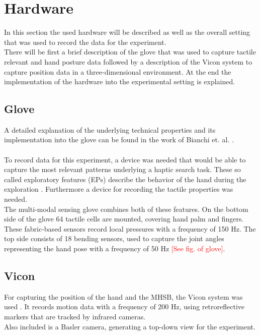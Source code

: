 \section{Hardware} \label{Hardware}
In this section the used hardware will be described as well as the overall setting that was used to record the data for the experiment.\\
There will be first a brief description of the glove that was used to capture tactile relevant and hand posture data followed by a description of the Vicon system to capture position data in a three-dimensional environment. At the end the implementation of the hardware into the experimental setting is explained.

\subsection{Glove}
A detailed explanation of the underlying technical properties and its implementation into the glove can be found in the work of Bianchi et. al. \cite{Glove}.\\
\\
To record data for this experiment, a device was needed that would be able to capture the most relevant patterns underlying a haptic search task. These so called exploratory features (EPs) describe the behavior of the hand during the exploration \cite{EPs}. Furthermore a device for recording the tactile properties was needed.\\
The multi-modal sensing glove combines both of these features. On the bottom side of the glove 64 tactile cells are mounted, covering hand palm and fingers. These fabric-based sensors record local pressures with a frequency of 150 Hz. The top side consists of 18 bending sensors, used to capture the joint angles representing the hand pose with a frequency of 50 Hz \textcolor{red}{[See fig. of glove]}.
 
\subsection{Vicon}
For capturing the position of the hand and the MHSB, the Vicon system was used \cite{Vicon}. It records motion data with a frequency of 200 Hz, using retroreflective markers that are tracked by infrared cameras.\\
Also included is a Basler camera, generating a top-down view for the experiment.

